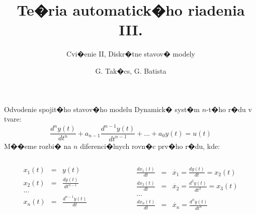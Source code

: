 \documentclass{beamer}
\title[TAR III.] %
{Te�ria automatick�ho riadenia III.}
\subtitle{Cvi�enie II, Diskr�tne stavov� modely}
\author[] %
{G. Tak�cs, G. Batista}
\institute[UAMAI] %
{
  �stav automatiz�cie, merania a aplikovanej informatiky\\
  Strojn�cka fakulta, Slovensk� technick� univerzita}
\date[28.09.2015] %
{}
\begin{document}

\begin{frame}
  \titlepage
\end{frame}

\begin{frame}{Odvodenie spojit�ho stavov�ho modelu}
Dynamick� syst�m $n$-t�ho r�du v tvare:
\begin{equation*}
\frac{d^{n}y(t)}{dt^{n}} + a_{n-1}\frac{d^{n-1}y(t)}{dt^{n-1}} +...+a_{0}y(t)=u(t)
\end{equation*}
M��eme rozbi� na $n$ diferenci�lnych rovn�c prv�ho r�du, kde:
\begin{columns}[T]

\begin{column}{0.48\textwidth}
\begin{eqnarray*}
x_{1}(t)&=&y(t)\\
x_{2}(t)&=&\frac{dy(t)}{dt^{n-1}}\\
...\\
x_{n}(t)&=&\frac{d^{n-1}y(t)}{dt}
\end{eqnarray*}
\end{column}

\begin{column}{0.48\textwidth}
\begin{eqnarray*}
\frac{dx_{1}(t)}{dt}&=&\dot{x_{1}}=\frac{dy(t)}{dt}=x_{2}(t)\\
\frac{dx_{2}(t)}{dt}&=&\dot{x_{2}}=\frac{d^{2}y(t)}{dt^{2}}=x_{3}(t)\\
...&\\
\frac{dx_{n}(t)}{dt}&=&\dot{x_{n}}=\frac{d^{n}y(t)}{dt^{n}}\\
\end{eqnarray*}
\end{column}
\end{columns}

\end{frame}
\end{document}
